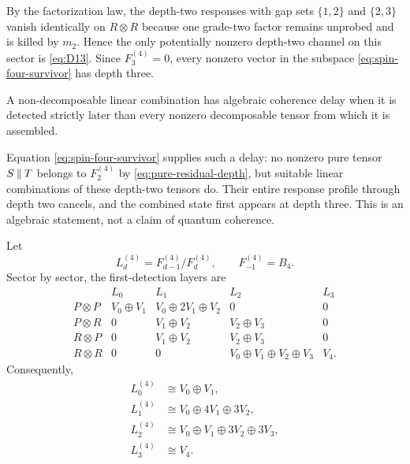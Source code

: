 By the factorization law, the depth-two responses with gap sets $\{1,2\}$ and $\{2,3\}$ vanish identically on $R\otimes R$ because one grade-two factor remains unprobed and is killed by $m_2$.  Hence the only potentially nonzero depth-two channel on this sector is \eqref{eq:D13}.  Since $F_3^{(4)}=0$, every nonzero vector in the subspace \eqref{eq:spin-four-survivor} has depth three.

\begin{definition}
A non-decomposable linear combination has algebraic coherence delay when it is detected strictly later than every nonzero decomposable tensor from which it is assembled.
\end{definition}

Equation \eqref{eq:spin-four-survivor} supplies such a delay: no nonzero pure tensor $S\mathbin{\Vert} T$ belongs to $F_2^{(4)}$ by \eqref{eq:pure-residual-depth}, but suitable linear combinations of these depth-two tensors do.  Their entire response profile through depth two cancels, and the combined state first appears at depth three.  This is an algebraic statement, not a claim of quantum coherence.

\begin{corollary}\label{cor:depth-layers}
Let
\[
  L_d^{(4)}=F_{d-1}^{(4)}/F_d^{(4)},
  \qquad F_{-1}^{(4)}=B_4.
\]
Sector by sector, the first-detection layers are
\begin{equation}\label{eq:sector-layers}
\begin{array}{c|cccc}
 &L_0&L_1&L_2&L_3\\
\hline
P\otimes P&V_0\oplus V_1&V_0\oplus2V_1\oplus V_2&0&0\\
P\otimes R&0&V_1\oplus V_2&V_2\oplus V_3&0\\
R\otimes P&0&V_1\oplus V_2&V_2\oplus V_3&0\\
R\otimes R&0&0&V_0\oplus V_1\oplus V_2\oplus V_3&V_4.
\end{array}
\end{equation}
Consequently,
\begin{equation}\label{eq:layers}
\begin{aligned}
 L_0^{(4)}&\cong V_0\oplus V_1,\\
 L_1^{(4)}&\cong V_0\oplus4V_1\oplus3V_2,\\
 L_2^{(4)}&\cong V_0\oplus V_1\oplus3V_2\oplus3V_3,\\
 L_3^{(4)}&\cong V_4.
\end{aligned}
\end{equation}
\end{corollary}

